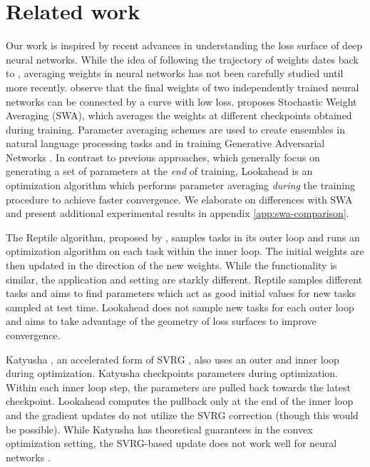 \documentclass{article}
\begin{document}
  \section{Related work}
\label{sec:related}
Our work is inspired by recent advances in understanding the loss surface of deep neural networks. While the idea of following the trajectory of weights dates back to \citet{ruppert1988efficient, polyak1992acceleration}, averaging weights in neural networks has not been carefully studied until more recently. \citet{garipov2018loss} observe that the final weights of two independently trained neural networks can be connected by a curve with low loss. \citet{izmailov2018averaging} proposes Stochastic Weight Averaging (SWA), which averages the weights at different checkpoints obtained during training. Parameter averaging schemes are used to create ensembles in natural language processing tasks \citep{jean2014using, merity2017regularizing} and in training Generative Adversarial Networks \citep{yasin2018averaging}. In contrast to previous approaches, which generally focus on generating a set of parameters at the \emph{end} of training, Lookahead is an optimization algorithm which performs parameter averaging \emph{during} the training procedure to achieve faster convergence. We elaborate on differences with SWA and present additional experimental results in appendix \ref{app:swa-comparison}.

The Reptile algorithm, proposed by \citet{nichol2018reptile}, samples tasks in its outer loop and runs an optimization algorithm on each task within the inner loop. The initial weights are then updated in the direction of the new weights. While the functionality is similar, the application and setting are starkly different. Reptile samples different tasks and aims to find parameters which act as good initial values for new tasks sampled at test time. Lookahead does not sample new tasks for each outer loop and aims to take advantage of the geometry of loss surfaces to improve convergence. 

Katyusha \citep{allen2017katyusha}, an accelerated form of SVRG \citep{johnson2013accelerating}, also uses an outer and inner loop during optimization. Katyusha checkpoints parameters during optimization. Within each inner loop step, the parameters are pulled back towards the latest checkpoint. Lookahead computes the pullback only at the end of the inner loop and the gradient updates do not utilize the SVRG correction (though this would be possible). While Katyusha has theoretical guarantees in the convex optimization setting, the SVRG-based update does not work well for neural networks \citep{1812.04529}. 
\end{document}
